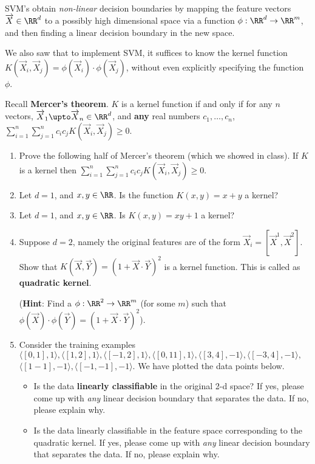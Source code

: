 \documentclass[11pt]{article}
\newenvironment{problem}[2][Problem]{\begin{trivlist}
\item[\hskip \labelsep {\bfseries #1}\hskip \labelsep {\bfseries #2.}]}{\end{trivlist}}
\begin{document}
\begin{problem}{1. (15 points)}
SVM's obtain \emph{non-linear} decision boundaries by mapping the feature vectors $\overrightarrow X\in \RR^d$ to a possibly high dimensional space via a function $\phi:\RR^d\to\RR^m$, and then finding a linear decision boundary in the new space. 

We also saw that to implement SVM, it suffices to know the kernel function $K(\overrightarrow X_i, \overrightarrow X_j)=\phi(\overrightarrow X_i)\cdot \phi(\overrightarrow X_j)$, without even explicitly specifying the function $\phi$. 

Recall \textbf{Mercer's theorem}. $K$ is a kernel function if and only if for any $n$ vectors, $\overrightarrow X_1\upto \overrightarrow X_n\in \RR^d$, and \textbf{any} real numbers $c_1, \ldots, c_n$, $\sum_{i=1}^n\sum_{j=1}^n c_i c_j K(\overrightarrow X_i, \overrightarrow X_j)\ge0$. 

\begin{enumerate}
\item 
Prove the following half of Mercer's theorem (which we showed in class). If $K$ is a kernel then $\sum_{i=1}^n\sum_{j=1}^n c_i c_j K(\overrightarrow X_i, \overrightarrow X_j)\ge0$. 
\item
Let $d=1$, and $x,y\in \RR$. Is the function $K(x,y)=x+y$ a kernel? 
\item 
Let $d=1$, and $x,y\in\RR$. Is $K(x,y)=xy+1$ a kernel?
\item
Suppose $d=2$, namely the original features are of the form $\overrightarrow X_i = [\overrightarrow X^1, \overrightarrow X^2]$. Show that $K(\overrightarrow X, \overrightarrow Y)=(1+\overrightarrow X\cdot \overrightarrow Y)^2$ is a kernel function. This is called as \textbf{quadratic kernel}.
 
(\textbf{Hint}: Find a $\phi:\RR^2\to \RR^m$ (for some $m$) such that $\phi(\overrightarrow X)\cdot \phi(\overrightarrow Y) = (1+\overrightarrow X\cdot \overrightarrow Y)^2$). 
\item
Consider the training examples $\langle[0, 1], 1\rangle, \langle[1, 2], 1\rangle,\langle[-1, 2], 1\rangle,\langle[0, 11], 1\rangle, \langle[3, 4], -1\rangle, \langle[-3, 4], -1\rangle,$ $ \langle[1 -1], -1\rangle, \langle[-1, -1], -1\rangle$. We have plotted the data points below.
\begin{itemize}
\item
Is the data \textbf{linearly classifiable} in the original 2-d space? 
If yes, please come up with \emph{any} linear decision boundary that separates the data.
If no, please explain why.
\item 
Is the data linearly classifiable in the feature space corresponding to the quadratic kernel. 
If yes, please come up with \emph{any} linear decision boundary that separates the data.
If no, please explain why.
\end{itemize}
\end{enumerate}


\end{problem}
\end{document}
